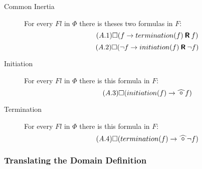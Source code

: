\begin{description}
  \item[Common Inertia]
  For every $Fl$ in $\Phi$ there is theses two formulas in $F$:
  \begin{equation}\tag{$A.1$}
    \square(f\rightarrow termination(f) \mathbin{\bm{\mathsf{R}}} f)
  \end{equation}
  \begin{equation}\tag{$A.2$}
    \square(\neg f\rightarrow initiation(f) \mathbin{\bm{\mathsf{R}}} \neg f)
  \end{equation}
  \item[Initiation]
  For every $Fl$ in $\Phi$ there is this formula in $F$:
  \begin{equation}\tag{$A.3$}
    \alwaysF(initiation(f)\rightarrow\wnext f)
  \end{equation}
  \item[Termination]
  For every $Fl$ in $\Phi$ there is this formula in $F$:
  \begin{equation}\tag{$A.4$}
    \alwaysF(termination(f)\rightarrow\wnext \neg f)
  \end{equation}
\end{description}

\subsubsection{Translating the Domain Definition}

